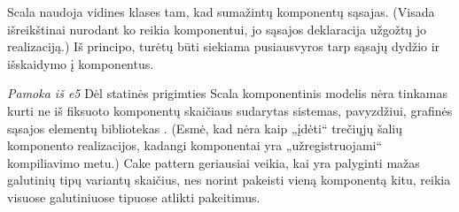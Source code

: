 Scala naudoja vidines klases tam, kad sumažintų komponentų
sąsajas.\cite[13]{scalable-component-abstractions}
(Visada išreikštinai nurodant ko reikia komponentui, jo sąsajos
deklaracija užgožtų jo realizaciją.) Iš principo, turėtų būti
siekiama pusiausvyros tarp sąsajų dydžio ir išskaidymo į komponentus.

\emph{Pamoka iš e5} Dėl statinės prigimties Scala komponentinis
modelis nėra tinkamas kurti ne iš fiksuoto komponentų skaičiaus
sudarytas sistemas, pavyzdžiui, grafinės sąsajos elementų bibliotekas
. (Esmė, kad nėra kaip „įdėti“ trečiųjų šalių
komponento realizacijos, kadangi komponentai yra „užregistruojami“
kompiliavimo metu.) Cake pattern geriausiai veikia, kai
yra palyginti mažas galutinių tipų variantų skaičius, nes norint
pakeisti vieną komponentą kitu, reikia visuose galutiniuose tipuose
atlikti pakeitimus.
